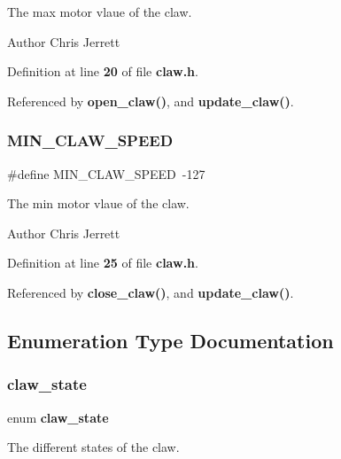 The max motor vlaue of the claw. 

\begin{DoxyAuthor}{Author}
Chris Jerrett 
\end{DoxyAuthor}


Definition at line \textbf{ 20} of file \textbf{ claw.\+h}.



Referenced by \textbf{ open\+\_\+claw()}, and \textbf{ update\+\_\+claw()}.

\mbox{\label{claw_8h_a7306e61a4209c74862aa81d7b3de74e5}} 
\subsubsection{M\+I\+N\+\_\+\+C\+L\+A\+W\+\_\+\+S\+P\+E\+ED}
{\footnotesize\ttfamily \#define M\+I\+N\+\_\+\+C\+L\+A\+W\+\_\+\+S\+P\+E\+ED~-\/127}



The min motor vlaue of the claw. 

\begin{DoxyAuthor}{Author}
Chris Jerrett 
\end{DoxyAuthor}


Definition at line \textbf{ 25} of file \textbf{ claw.\+h}.



Referenced by \textbf{ close\+\_\+claw()}, and \textbf{ update\+\_\+claw()}.



\subsection{Enumeration Type Documentation}
\mbox{\label{claw_8h_a600668fd307d596c3812126657335324}} 
\subsubsection{claw\+\_\+state}
{\footnotesize\ttfamily enum \textbf{ claw\+\_\+state}}



The different states of the claw. 

